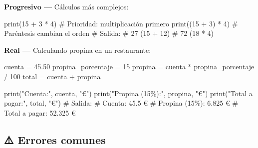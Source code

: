 \documentclass[
  doc,
  floatsintext,
  longtable,
  a4paper,
  nolmodern,
  notxfonts,
  notimes,
  12pt,
  colorlinks=true,linkcolor=blue,citecolor=blue,urlcolor=blue]{apa7}
\newenvironment{Shaded}{\begin{snugshade}}{\end{snugshade}}
\newcommand{\BuiltInTok}[1]{\textcolor[rgb]{0.00,0.23,0.31}{#1}}
\newcommand{\CommentTok}[1]{\textcolor[rgb]{0.37,0.37,0.37}{#1}}
\newcommand{\DecValTok}[1]{\textcolor[rgb]{0.68,0.00,0.00}{#1}}
\newcommand{\FloatTok}[1]{\textcolor[rgb]{0.68,0.00,0.00}{#1}}
\newcommand{\NormalTok}[1]{\textcolor[rgb]{0.00,0.23,0.31}{#1}}
\newcommand{\OperatorTok}[1]{\textcolor[rgb]{0.37,0.37,0.37}{#1}}
\newcommand{\StringTok}[1]{\textcolor[rgb]{0.13,0.47,0.30}{#1}}
\begin{document}
\textbf{Progresivo ---} Cálculos más complejos:

\begin{Shaded}
\begin{Highlighting}[]
\BuiltInTok{print}\NormalTok{(}\DecValTok{15} \OperatorTok{+} \DecValTok{3} \OperatorTok{*} \DecValTok{4}\NormalTok{)        }\CommentTok{\# Prioridad: multiplicación primero}
\BuiltInTok{print}\NormalTok{((}\DecValTok{15} \OperatorTok{+} \DecValTok{3}\NormalTok{) }\OperatorTok{*} \DecValTok{4}\NormalTok{)      }\CommentTok{\# Paréntesis cambian el orden}
\CommentTok{\# Salida:}
\CommentTok{\# 27   (15 + 12)}
\CommentTok{\# 72   (18 * 4)}
\end{Highlighting}
\end{Shaded}

\textbf{Real ---} Calculando propina en un restaurante:

\begin{Shaded}
\begin{Highlighting}[]
\NormalTok{cuenta }\OperatorTok{=} \FloatTok{45.50}
\NormalTok{propina\_porcentaje }\OperatorTok{=} \DecValTok{15}
\NormalTok{propina }\OperatorTok{=}\NormalTok{ cuenta }\OperatorTok{*}\NormalTok{ propina\_porcentaje }\OperatorTok{/} \DecValTok{100}
\NormalTok{total }\OperatorTok{=}\NormalTok{ cuenta }\OperatorTok{+}\NormalTok{ propina}

\BuiltInTok{print}\NormalTok{(}\StringTok{"Cuenta:"}\NormalTok{, cuenta, }\StringTok{"€"}\NormalTok{)}
\BuiltInTok{print}\NormalTok{(}\StringTok{"Propina (15\%):"}\NormalTok{, propina, }\StringTok{"€"}\NormalTok{)}
\BuiltInTok{print}\NormalTok{(}\StringTok{"Total a pagar:"}\NormalTok{, total, }\StringTok{"€"}\NormalTok{)}
\CommentTok{\# Salida:}
\CommentTok{\# Cuenta: 45.5 €}
\CommentTok{\# Propina (15\%): 6.825 €}
\CommentTok{\# Total a pagar: 52.325 €}
\end{Highlighting}
\end{Shaded}

\subsection{⚠️ Errores comunes}\label{errores-comunes}
\end{document}
